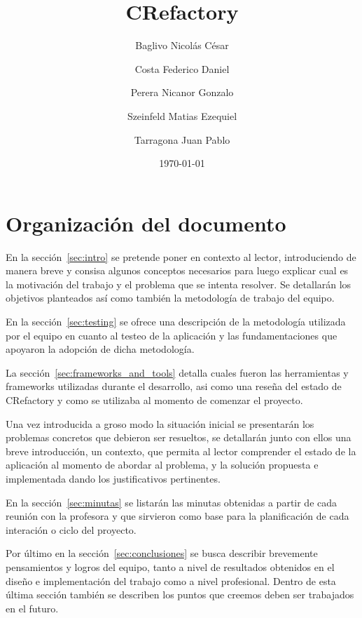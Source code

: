 \documentclass[a4paper,oneside,12pt]{article}
\begin{document}

\title{CRefactory}
\author{Baglivo Nicol\'as C\'esar \and Costa Federico Daniel \and Perera Nicanor Gonzalo \and Szeinfeld Matias Ezequiel \and Tarragona Juan Pablo}
\date{\today}
\maketitle

\tableofcontents

\newpage

\section{Organizaci\'on del documento}
En la secci\'on~\ref{sec:intro} se pretende poner en contexto al lector, introduciendo de manera breve y consisa algunos conceptos necesarios para luego explicar cual es la motivaci\'on del trabajo y el problema que se intenta resolver. Se detallar\'an los objetivos planteados as\'i como tambi\'en la metodolog\'ia de trabajo del equipo.

En la secci\'on~\ref{sec:testing} se ofrece una descripci\'on de la metodolog\'ia utilizada por el equipo en cuanto al testeo de la aplicaci\'on y las fundamentaciones que apoyaron la adopci\'on de dicha metodolog\'ia.

La secci\'on~\ref{sec:frameworks_and_tools} detalla cuales fueron las herramientas y frameworks utilizadas durante el desarrollo, asi como una reseña del estado de CRefactory y como se utilizaba al momento de comenzar el proyecto.

Una vez introducida a groso modo la situaci\'on inicial se presentar\'an los problemas concretos que debieron ser resueltos, se detallar\'an junto con ellos una breve introducci\'on, un contexto, que permita al lector comprender el estado de la aplicaci\'on al momento de abordar al problema, y la soluci\'on propuesta e implementada dando los justificativos pertinentes.

En la secci\'on~\ref{sec:minutas} se listar\'an las minutas obtenidas a partir de cada reuni\'on con la profesora y que sirvieron como base para la planificaci\'on de cada interaci\'on o ciclo del proyecto.

Por \'ultimo en la secci\'on~\ref{sec:conclusiones} se busca describir brevemente pensamientos y logros del equipo, tanto a nivel de resultados obtenidos en el diseño e implementaci\'on del trabajo como a nivel profesional. Dentro de esta \'ultima secci\'on tambi\'en se describen los puntos que creemos deben ser trabajados en el futuro.
\end{document}
